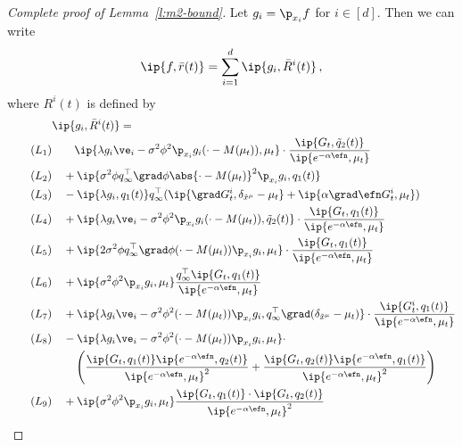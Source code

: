 \documentclass{amsart}
\begin{document}
\begin{proof}[Complete proof of Lemma~\ref{l:m2-bound}]
	Let $g_i = \p_{x_i} f$ for $i \in [d]$. 
	Then we can write 
	\begin{equation*}
		\ip{f, \bar r(t)} = \sum_{i=1}^d \ip{g_i, \bar R^i(t)} \,,
	\end{equation*}
	where $R^i(t)$ is defined by 
	\begin{align}
		\nonumber
		& \ip{g_i, \bar R^i(t)} = \\
		\label{e:r-l1} \tag{$L_1$}
		& \qquad \ip{\lambda g_i \ve_i - \sigma^2 \phi^2 \p_{x_i} g_i (\cdot-M(\mu_t)), \mu_t} \cdot \frac{\ip{G_t, \tilde q_2(t)}}{\ip{e^{-\alpha\efn}, \mu_t}} \\
		\label{e:r-l2} \tag{$L_2$}
		& \quad + \ip{\sigma^2 \phi q_\infty^\top \grad \phi \abs{\cdot-M(\mu_t)}^2 \p_{x_i} g_i, q_1(t)} \\
		\label{e:r-l3} \tag{$L_3$}
		& \quad - \ip{\lambda g_i, q_1(t)} q_\infty^\top ( \ip{\grad G_t^i, \delta_{\tilde x^\mu} - \mu_t} + \ip{\alpha \grad \efn G_t^i, \mu_t} ) \\
		\label{e:r-l4} \tag{$L_4$}
		& \quad + \ip{\lambda g_i \ve_i - \sigma^2 \phi^2 \p_{x_i} g_i (\cdot-M(\mu_t)), \tilde q_2(t)} \cdot \frac{\ip{G_t, q_1(t)}}{\ip{e^{-\alpha\efn}, \mu_t}} \\
		\label{e:r-l5} \tag{$L_5$}
		& \quad + \ip{2\sigma^2 \phi q_\infty^\top \grad \phi (\cdot - M(\mu_t)) \p_{x_i} g_i, \mu_t} \cdot \frac{\ip{G_t, q_1(t)}}{\ip{e^{-\alpha\efn}, \mu_t}} \\
		\label{e:r-l6} \tag{$L_6$}
		& \quad + \ip{\sigma^2 \phi^2 \p_{x_i} g_i, \mu_t} \frac{q_\infty^\top \ip{G_t, q_1(t)}}{\ip{e^{-\alpha\efn}, \mu_t}} \\
		\label{e:r-l7} \tag{$L_7$}
		& \quad + \ip{ \lambda g_i \ve_i - \sigma^2 \phi^2 (\cdot-M(\mu_t)) \p_{x_i} g_i, q_\infty^\top \grad(\delta_{\tilde x^\mu}-\mu_t) } \cdot \frac{\ip{G_t^i, q_1(t)}}{\ip{e^{-\alpha\efn},\mu_t}} \\
		\label{e:r-l8} \tag{$L_8$}
		& \quad - \ip {\lambda g_i \ve_i - \sigma^2 \phi^2 (\cdot-M(\mu_t)) \p_{x_i} g_i, \mu_t} \cdot \\ 
		\nonumber 
		& \qquad \left( \frac{ \ip{G_t, q_1(t)} \ip{e^{-\alpha\efn}, q_2(t)} }{ \ip{e^{-\alpha\efn},\mu_t}^2 } +  \frac{ \ip{G_t, q_2(t)} \ip{e^{-\alpha\efn}, q_1(t)} }{ \ip{e^{-\alpha\efn},\mu_t}^2 } \right) \\
		\label{e:r-l9} \tag{$L_9$}
		& \quad + \ip{ \sigma^2 \phi^2 \p_{x_i} g_i, \mu_t} \frac{ \ip{G_t, q_1(t)} \cdot \ip{G_t, q_2(t)} }{ \ip{e^{-\alpha\efn},\mu_t}^2 } \\

\end{align}
\end{proof}
\end{document}
